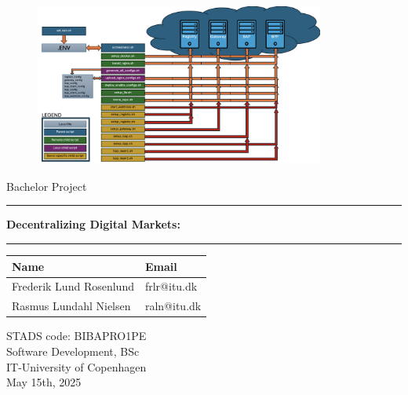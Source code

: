 \begin{titlepage}
\begin{center}
\newcommand{\quickcharcount}[1]{%
  \immediate\write18{texcount -1 -sum -merge -char -q #1.tex output.bbl > #1-chars.sum }%
}
\vspace{1cm}

\begin{figure}
        \centering
        \includegraphics[width=0.85\textwidth]{Images/orchestrator_architecture.png} %
\end{figure}

\vspace{1cm}

{\Large Bachelor Project}\\[0.7em]
\vspace{.5cm}
\hrule
\vspace{.5cm}
{\LARGE \bfseries Decentralizing Digital Markets:}\\[0.5em]
{\Large \titleDocument}
\vspace{.5cm}

\hrule
\vspace{1cm}

\centering

\begin{center}
\setlength{\tabcolsep}{30pt}
\renewcommand{\arraystretch}{1.2}
\begin{tabular}{ll}
    \Large{Name} & \Large{Email} \\\hline
    Frederik Lund Rosenlund & frlr@itu.dk \\
    Rasmus Lundahl Nielsen & raln@itu.dk \\
\end{tabular}
\end{center}

\vspace{1.5cm}
STADS code: BIBAPRO1PE\\
Software Development, BSc\\
IT-University of Copenhagen\\
May 15th, 2025 %

\vspace{.5cm} 

\vspace{.5cm}


\end{center}
\end{titlepage}
